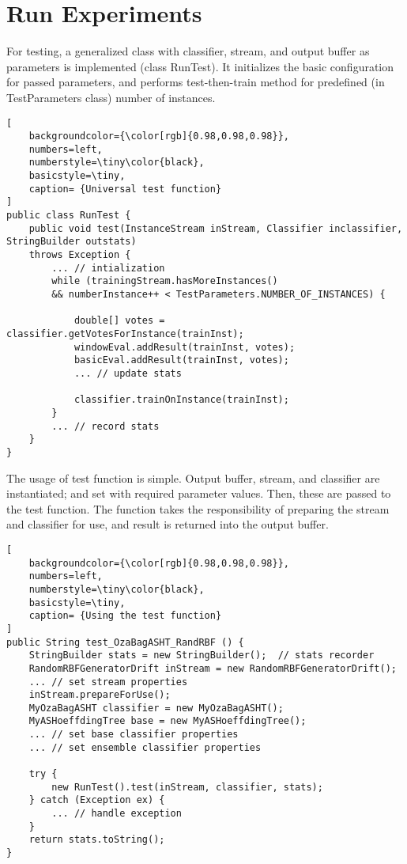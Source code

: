 \section*{Run Experiments}
For testing, a generalized class with classifier, stream, and output buffer as parameters is implemented (class RunTest). It initializes the basic configuration for passed parameters, and performs test-then-train method for predefined (in TestParameters class) number of instances.
\begin{lstlisting}[
    backgroundcolor={\color[rgb]{0.98,0.98,0.98}},
    numbers=left,
    numberstyle=\tiny\color{black},
    basicstyle=\tiny,
    caption= {Universal test function}
]
public class RunTest {
    public void test(InstanceStream inStream, Classifier inclassifier, StringBuilder outstats) 
    throws Exception {
        ... // intialization
        while (trainingStream.hasMoreInstances()
        && numberInstance++ < TestParameters.NUMBER_OF_INSTANCES) {
            
            double[] votes = classifier.getVotesForInstance(trainInst);
            windowEval.addResult(trainInst, votes);
            basicEval.addResult(trainInst, votes);
            ... // update stats
            
            classifier.trainOnInstance(trainInst);
        }
        ... // record stats
    }
}
\end{lstlisting}
The usage of test function is simple. Output buffer, stream, and classifier are instantiated; and set with required parameter values. Then, these are passed to the test function. The function takes the responsibility of preparing the stream and classifier for use, and result is returned into the output buffer. %
\begin{lstlisting}[
    backgroundcolor={\color[rgb]{0.98,0.98,0.98}},
    numbers=left,
    numberstyle=\tiny\color{black},
    basicstyle=\tiny,
    caption= {Using the test function}
]
public String test_OzaBagASHT_RandRBF () {	
    StringBuilder stats = new StringBuilder();	// stats recorder	
    RandomRBFGeneratorDrift inStream = new RandomRBFGeneratorDrift();
    ...	// set stream properties
    inStream.prepareForUse();	
    MyOzaBagASHT classifier = new MyOzaBagASHT();
    MyASHoeffdingTree base = new MyASHoeffdingTree();
    ...	// set base classifier properties
    ...	// set ensemble classifier properties
    
    try {
        new RunTest().test(inStream, classifier, stats);
    } catch (Exception ex) {
        ...	// handle exception
    }
    return stats.toString();
}
\end{lstlisting}